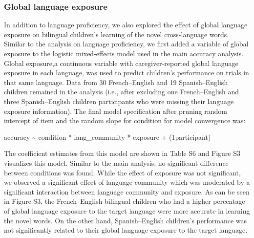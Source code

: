 \documentclass[
  man,floatsintext]{apa7}
\begin{document}
\hypertarget{global-language-exposure}{%
\subsubsection{Global language exposure}\label{global-language-exposure}}

In addition to language proficiency, we also explored the effect of global language exposure on bilingual children's learning of the novel cross-language words. Similar to the analysis on language proficiency, we first added a variable of global exposure to the logistic mixed-effects model used in the main accuracy analysis. Global exposure,a continuous variable with caregiver-reported global language exposure in each language, was used to predict children's performance on trials in that same language. Data from 30 French--English and 19 Spanish--English children remained in the analysis (i.e., after excluding one French--English and three Spanish--English children participants who were missing their language exposure information). The final model specification after pruning random intercept of item and the random slope for condition for model convergence was:

accuracy \textasciitilde{} condition * lang\_community * exposure + (1\textbar participant)

\noindent The coefficient estimates from this model are shown in Table S6 and Figure S3 visualizes this model. Similar to the main analysis, no significant difference between conditions was found. While the effect of exposure was not significant, we observed a significant effect of language community which was moderated by a significant interaction between language community and exposure. As can be seen in Figure S3, the French--English bilingual children who had a higher percentage of global language exposure to the target language were more accurate in learning the novel words. On the other hand, Spanish--English children's performance was not significantly related to their global language exposure to the target language.
\end{document}
